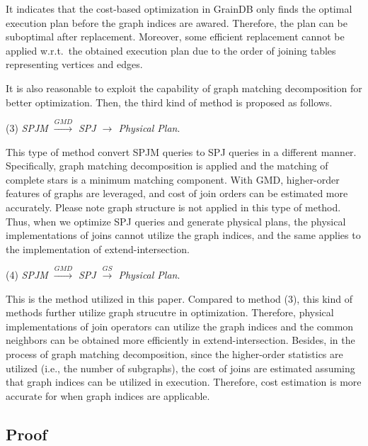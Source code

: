It indicates that the cost-based optimization in GrainDB only finds the optimal execution plan before the graph indices are awared.
Therefore, the plan can be suboptimal after replacement.
Moreover, some efficient replacement cannot be applied w.r.t.~the obtained execution plan due to the order of joining tables representing vertices and edges.


It is also reasonable to exploit the capability of graph matching decomposition for better optimization.
Then, the third kind of method is proposed as follows.

(3) \emph{SPJM $\xrightarrow{GMD}$ SPJ $\rightarrow$ Physical Plan}.

This type of method convert SPJM queries to SPJ queries in a different manner.
Specifically, graph matching decomposition is applied and the matching of complete stars is a minimum matching component.
With GMD, higher-order features of graphs are leveraged, and cost of join orders can be estimated more accurately.
Please note graph structure is not applied in this type of method.
Thus, when we optimize SPJ queries and generate physical plans, the physical implementations of joins cannot utilize the graph indices, and the same applies to the implementation of extend-intersection.


(4) \emph{SPJM $\xrightarrow{GMD}$ SPJ $\xrightarrow{GS}$ Physical Plan}.

This is the method utilized in this paper.
Compared to method (3), this kind of methods further utilize graph strucutre in optimization.
Therefore, physical implementations of join operators can utilize the graph indices and the common neighbors can be obtained more efficiently in extend-intersection.
Besides, in the process of graph matching decomposition, since the higher-order statistics are utilized (i.e., the number of subgraphs), the cost of joins are estimated assuming that graph indices can be utilized in execution.
Therefore, cost estimation is more accurate for when graph indices are applicable. 

\subsection{Proof}

